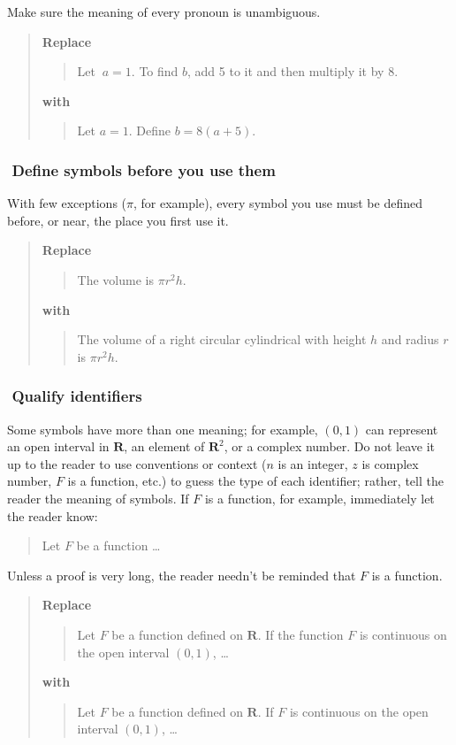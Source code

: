 \documentclass[12pt]{article}
\newcounter{ex}\setcounter{ex}{0}
\newcommand{\ex}{%
\hspace{-0.2in} \setcounter{ex}{\value{ex}+1}
\theex \,\,}
\newcounter{id}\setcounter{id}{0}
\newcounter{se}\setcounter{se}{0}
\begin{document}
Make sure the meaning of every pronoun is unambiguous.

\begin{quote}
\textbf{\textbf{Replace}}
\begin{quote}
   Let \(\ a = 1\). To find \(b\), add 5 to it and then multiply it by 8.
\end{quote}
\textbf{with} 
\begin{quote}
   Let \(a = 1\).  Define \(b = 8 (a + 5)\).
\end{quote}
\end{quote}

\subsubsection*{\ex Define symbols before you use them}

With few exceptions (\(\pi\), for example), every symbol you use must be defined
before, or near, the place you first use it.

\begin{quote}
\textbf{\textbf{Replace}}
\begin{quote}
The volume is \(\pi r^2 h\).
\end{quote}
\textbf{with}
\begin{quote}
The volume of a right circular cylindrical with height \(h\) and
radius \(r\) is \(\pi r^2 h\).

\end{quote}
\end{quote}
\subsubsection*{\ex  Qualify identifiers} 

Some symbols have more than one meaning; for example, $(0,1)$ can
represent an open interval in $\mathbf{R}$, an element of
\(\mathbf{R}^2\), or a complex number.  Do not leave it up to the reader
to use conventions or context (\(n\) is an integer, \(z\) is complex
number, \(F\) is a function, etc.) to guess the type of each
identifier; rather, tell the reader the meaning of symbols.  If $F$ is
a function, for example, immediately let the reader know:
\begin{quote}
   Let $F$ be a function \dots
\end{quote}
Unless a proof is very long, the reader needn't be reminded that
$F$ is a function. 
\begin{quote}
\textbf{\textbf{Replace}}
\begin{quote}
  Let $F$ be a function defined on $\mathbf{R}$.  If the function $F$ is continuous on
  the open interval $(0,1)$,  \dots
\end{quote}
\textbf{with}
\begin{quote}
  Let \(F\) be a function defined on \(\mathbf{R}\).  If \(F\) is continuous on
  the open interval \((0,1)\), \dots
\end{quote}
\end{quote}
\end{document}
